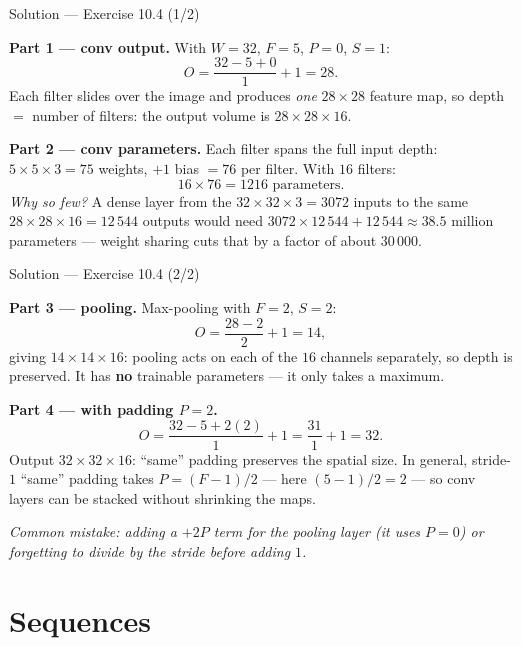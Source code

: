 \documentclass[aspectratio=169,11pt]{beamer}
\begin{document}
\begin{frame}{Solution --- Exercise 10.4 (1/2)}
\begin{solutionbox}
  \textbf{Part 1 --- conv output.} With $W = 32$, $F = 5$, $P = 0$,
  $S = 1$:
  \[
    O = \frac{32 - 5 + 0}{1} + 1 = 28 .
  \]
  Each filter slides over the image and produces \emph{one} $28 \times 28$
  feature map, so depth $=$ number of filters: the output volume is
  $28 \times 28 \times 16$.

  \medskip
  \textbf{Part 2 --- conv parameters.} Each filter spans the full
  input depth: $5 \times 5 \times 3 = 75$ weights, $+1$ bias $= 76$
  per filter. With $16$ filters:
  \[
    16 \times 76 = \boxed{1216} \text{ parameters.}
  \]
  \emph{Why so few?} A dense layer from the $32 \times 32 \times 3 = 3072$
  inputs to the same $28 \times 28 \times 16 = 12\,544$ outputs would need
  $3072 \times 12\,544 + 12\,544 \approx 38.5$ million parameters --- weight
  sharing cuts that by a factor of about $30\,000$.
\end{solutionbox}
\end{frame}

\begin{frame}{Solution --- Exercise 10.4 (2/2)}
\begin{solutionbox}
  \textbf{Part 3 --- pooling.} Max-pooling with $F = 2$, $S = 2$:
  \[
    O = \frac{28 - 2}{2} + 1 = 14 ,
  \]
  giving $14 \times 14 \times 16$: pooling acts on each of the $16$ channels
  separately, so depth is preserved. It has \textbf{no} trainable
  parameters --- it only takes a maximum.

  \medskip
  \textbf{Part 4 --- with padding $P = 2$.}
  \[
    O = \frac{32 - 5 + 2(2)}{1} + 1 = \frac{31}{1} + 1 = 32 .
  \]
  Output $32 \times 32 \times 16$: ``same'' padding preserves the
  spatial size. In general, stride-$1$ ``same'' padding takes
  $P = (F-1)/2$ --- here $(5-1)/2 = 2$ --- so conv layers can be stacked
  without shrinking the maps.

  \medskip
  \textit{Common mistake: adding a $+2P$ term for the pooling layer (it uses
  $P = 0$) or forgetting to divide by the stride \emph{before} adding $1$.}
\end{solutionbox}
\end{frame}





\section{Sequences}
\end{document}

